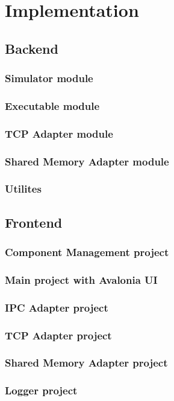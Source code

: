 \chapter{Implementation}

\section{Backend}

\subsection{Simulator module}

\subsection{Executable module}

\subsection{TCP Adapter module}

\subsection{Shared Memory Adapter module}

\subsection{Utilites}

\section{Frontend}

\subsection{Component Management project}

\subsection{Main project with Avalonia UI}

\subsection{IPC Adapter project}

\subsection{TCP Adapter project}

\subsection{Shared Memory Adapter project}

\subsection{Logger project}
